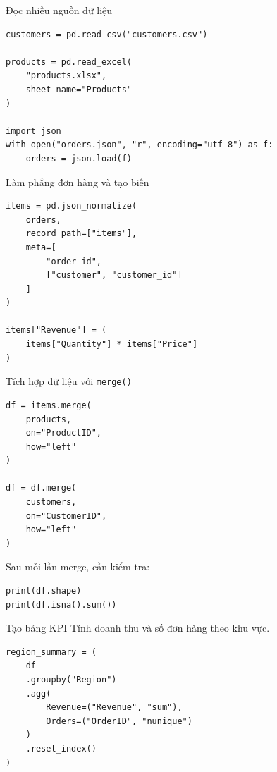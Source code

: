 \documentclass[aspectratio=169,11pt]{beamer}
\newcommand{\code}[1]{\texttt{#1}}
\begin{document}
\begin{frame}[fragile]{Đọc nhiều nguồn dữ liệu}
\begin{lstlisting}[style=pythonstyle]
customers = pd.read_csv("customers.csv")

products = pd.read_excel(
    "products.xlsx",
    sheet_name="Products"
)

import json
with open("orders.json", "r", encoding="utf-8") as f:
    orders = json.load(f)
\end{lstlisting}
\end{frame}

\begin{frame}[fragile]{Làm phẳng đơn hàng và tạo biến}
\begin{lstlisting}[style=pythonstyle]
items = pd.json_normalize(
    orders,
    record_path=["items"],
    meta=[
        "order_id",
        ["customer", "customer_id"]
    ]
)

items["Revenue"] = (
    items["Quantity"] * items["Price"]
)
\end{lstlisting}
\end{frame}

\begin{frame}[fragile]{Tích hợp dữ liệu với \code{merge()}}
\begin{lstlisting}[style=pythonstyle]
df = items.merge(
    products,
    on="ProductID",
    how="left"
)

df = df.merge(
    customers,
    on="CustomerID",
    how="left"
)
\end{lstlisting}

Sau mỗi lần merge, cần kiểm tra:
\begin{lstlisting}[style=pythonstyle]
print(df.shape)
print(df.isna().sum())
\end{lstlisting}
\end{frame}

\begin{frame}[fragile]{Tạo bảng KPI}
Tính doanh thu và số đơn hàng theo khu vực.

\begin{lstlisting}[style=pythonstyle]
region_summary = (
    df
    .groupby("Region")
    .agg(
        Revenue=("Revenue", "sum"),
        Orders=("OrderID", "nunique")
    )
    .reset_index()
)
\end{lstlisting}
\end{frame}
\end{document}
